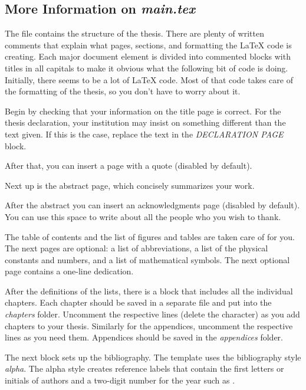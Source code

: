 \subsection{More Information on \emph{main.tex}}

The  file contains the structure of the thesis. There are plenty of written comments that explain what pages, sections, and formatting the LaTeX code is creating. Each major document element is divided into commented blocks with titles in all capitals to make it obvious what the following bit of code is doing. Initially, there seems to be a lot of LaTeX code. Most of that code takes care of the formatting of the thesis, so you don't have to worry about it.

Begin by checking that your information on the title page is correct. For the thesis declaration, your institution may insist on something different than the text given. If this is the case, replace the text in the \emph{DECLARATION PAGE} block.

After that, you can insert a page with a quote (disabled by default).

Next up is the abstract page, which concisely summarizes your work.

After the abstract you can insert an acknowledgments page (disabled by default).
 You can use this space to write about all the people who you wish to thank.

The table of contents and the list of figures and tables are taken care of for you.%
The next pages are optional: a list of abbreviations, a list of the physical constants and numbers, and a list of mathematical symbols.
The next optional page contains a one-line dedication.

After the definitions of the lists, there is a block that includes all the individual chapters. Each chapter should be saved in a separate file and put into the \emph{chapters} folder. Uncomment the respective lines (delete the \code{\%} character) as you add chapters to your thesis. Similarly for the appendices, uncomment the respective lines as you need them. Appendices should be saved in the \emph{appendices} folder.

The next block sets up the bibliography. The template uses the bibliography style \emph{alpha}. The alpha style creates reference labels that contain the first letters or initials of authors and a two-digit number for the year such as \cite{Hintz02}.


